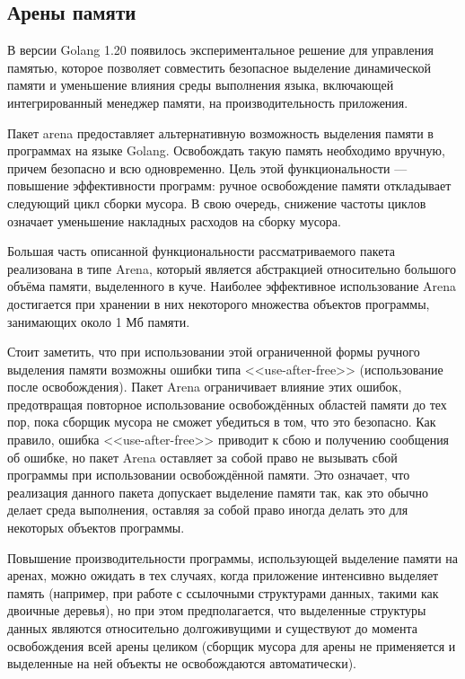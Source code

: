 \subsection{Арены памяти}

В версии Golang 1.20 появилось экспериментальное решение для управления памятью, которое позволяет совместить безопасное выделение динамической памяти и уменьшение влияния среды выполнения языка, включающей интегрированный менеджер памяти, на производительность приложения.


Пакет arena предоставляет альтернативную возможность выделения памяти в программах на языке Golang. Освобождать такую память необходимо вручную, причем безопасно и всю одновременно. Цель этой функциональности --- повышение эффективности программ: ручное освобождение памяти откладывает следующий цикл сборки мусора. В свою очередь, снижение частоты циклов означает уменьшение накладных расходов на сборку мусора. \cite{golang_arena_cource}

Большая часть описанной функциональности рассматриваемого пакета реализована в типе Arena, который является абстракцией относительно большого объёма памяти, выделенного в куче. Наиболее эффективное использование Arena достигается при хранении в них некоторого множества объектов программы, занимающих около 1 Мб памяти. \cite{golang_arena_cource} \cite{golang_arena_proposal}

Стоит заметить, что при использовании этой ограниченной формы ручного выделения памяти возможны ошибки типа <<use-after-free>> (использование после освобождения). Пакет Arena ограничивает влияние этих ошибок, предотвращая повторное использование освобождённых областей памяти до тех пор, пока сборщик мусора не сможет убедиться в том, что это безопасно. Как правило, ошибка <<use-after-free>> приводит к сбою и получению сообщения об ошибке, но пакет Arena оставляет за собой право не вызывать сбой программы при использовании освобождённой памяти. Это означает, что реализация данного пакета допускает выделение памяти так, как это обычно делает среда выполнения, оставляя за собой право иногда делать это для некоторых объектов программы.~\cite{golang_arena_cource}

Повышение производительности программы, использующей выделение памяти на аренах, можно ожидать в тех случаях, когда приложение интенсивно выделяет память (например, при работе с ссылочными структурами данных, такими как двоичные деревья), но при этом предполагается, что выделенные структуры данных являются относительно долгоживущими и существуют до момента освобождения всей арены целиком (сборщик мусора для арены не применяется и выделенные на ней объекты не освобождаются автоматически). 


